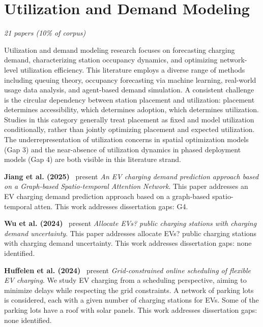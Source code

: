 \documentclass[letterpaper, 12pt, oneside, doublespacing]{Thesis}
\begin{document}
\section{Utilization and Demand Modeling}

\textit{21 papers (10\% of corpus)}

Utilization and demand modeling research focuses on forecasting charging demand, characterizing station occupancy dynamics, and optimizing network-level utilization efficiency. This literature employs a diverse range of methods including queuing theory, occupancy forecasting via machine learning, real-world usage data analysis, and agent-based demand simulation. A consistent challenge is the circular dependency between station placement and utilization: placement determines accessibility, which determines adoption, which determines utilization. Studies in this category generally treat placement as fixed and model utilization conditionally, rather than jointly optimizing placement and expected utilization. The underrepresentation of utilization concerns in spatial optimization models (Gap 3) and the near-absence of utilization dynamics in phased deployment models (Gap 4) are both visible in this literature strand.


\noindent \textbf{Jiang et al. (2025)}~\cite{an_electric_2025} present \textit{An EV charging demand prediction approach based on a Graph-based Spatio-temporal Attention Network}. This paper addresses an EV charging demand prediction approach based on a graph-based spatio-temporal atten. This work addresses dissertation gaps: G4.



\noindent \textbf{Wu et al. (2024)}~\cite{allocate_electric_2024} present \textit{Allocate EVs? public charging stations with charging demand uncertainty}. This paper addresses allocate EVs? public charging stations with charging demand uncertainty. This work addresses dissertation gaps: none identified.



\noindent \textbf{Huffelen et al. (2024)}~\cite{grid-constrained_online_2024} present \textit{Grid-constrained online scheduling of flexible EV charging}. We study EV charging from a scheduling perspective, aiming to minimize delays while respecting the grid constraints. A network of parking lots is considered, each with a given number of charging stations for EVs. Some of the parking lots have a roof with solar panels. This work addresses dissertation gaps: none identified.
\end{document}
